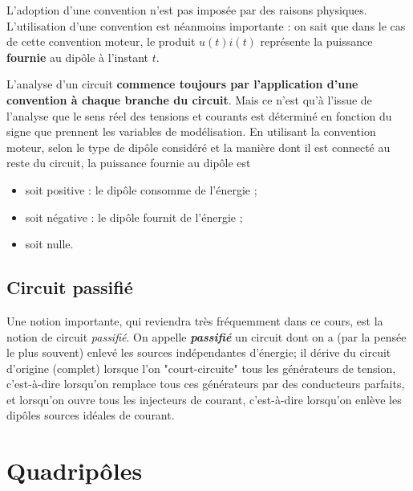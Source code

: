 L'adoption d'une convention n'est pas imposée par des raisons physiques. L'utilisation d'une convention est néanmoins importante : on sait que dans le cas de cette convention moteur, le produit $u(t) i(t)$ représente la puissance \textbf{fournie} au dipôle à l'instant $t$.

L'analyse d'un circuit \textbf{commence toujours par l'application d'une con\-vention à chaque branche du circuit}. Mais ce n'est qu'à l'issue de l'analyse que le sens réel des tensions et courants est déterminé en fonction du signe que prennent les variables de modélisation. En utilisant la convention moteur, selon le type de dipôle considéré et la manière dont il est connecté au reste du circuit, la puissance fournie au dipôle est 
\begin{itemize}
	\item soit positive : le dipôle consomme de l'énergie ;
	\item soit négative : le dipôle fournit de l'énergie ;
	\item soit nulle.
\end{itemize} 

\subsection{Circuit passifié}
Une notion importante, qui reviendra très fréquemment dans ce cours, est la notion de circuit \textit{ passifié}.
On appelle \textit{\textbf{passifié}} un circuit dont on a (par la pensée le plus souvent) enlevé les sources indépendantes d'énergie; il dérive du circuit d'origine (complet) lorsque l'on "court-circuite" tous les générateurs de tension, c'est-à-dire lorsqu'on remplace tous ces générateurs par des conducteurs parfaits, et lorsqu'on ouvre tous les injecteurs de courant, c'est-à-dire lorsqu'on enlève les dipôles sources idéales de courant.

\section{Quadripôles}


